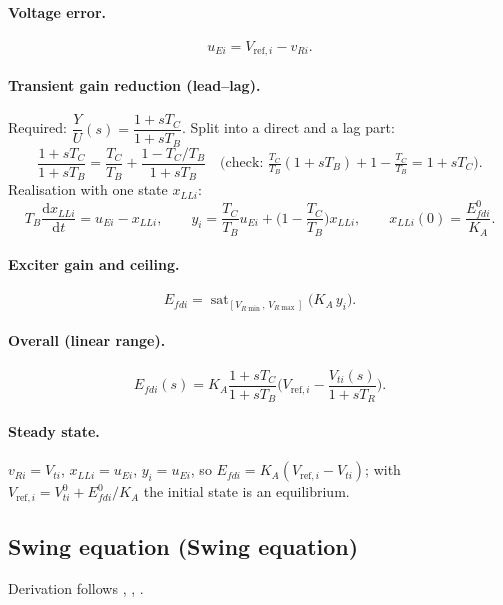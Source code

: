 \documentclass[11pt,a4paper]{article}
\numberwithin{equation}{section}
\newcommand{\sat}{\operatorname{sat}}
\newcommand{\dd}{\mathrm{d}}
\newcommand{\blk}[1]{\textsf{#1}}
\begin{document}
\paragraph{Voltage error.}
\begin{equation}
u_{Ei} = V_{\text{ref},i} - v_{Ri}.
\end{equation}
\paragraph{Transient gain reduction (lead--lag).} Required: $\dfrac{Y}{U}(s) = \dfrac{1+sT_C}{1+sT_B}$. Split into a direct and a lag part:
\begin{equation}
\frac{1+sT_C}{1+sT_B} = \frac{T_C}{T_B} + \frac{1-T_C/T_B}{1+sT_B}
\quad\Big(\text{check: } \tfrac{T_C}{T_B}(1+sT_B) + 1 - \tfrac{T_C}{T_B} = 1 + sT_C\Big).
\end{equation}
Realisation with one state $x_{LLi}$:
\begin{equation}
\boxed{T_B\frac{\dd x_{LLi}}{\dd t} = u_{Ei} - x_{LLi},\qquad
y_i = \frac{T_C}{T_B}u_{Ei} + \Big(1-\frac{T_C}{T_B}\Big)x_{LLi},\qquad x_{LLi}(0) = \frac{E_{fdi}^0}{K_A}.}
\end{equation}
\paragraph{Exciter gain and ceiling.}
\begin{equation}
\boxed{E_{fdi} = \sat_{[V_{R\min},\,V_{R\max}]}\big(K_A\,y_i\big).}
\end{equation}
\paragraph{Overall (linear range).}
\begin{equation}
E_{fdi}(s) = K_A\frac{1+sT_C}{1+sT_B}\Big(V_{\text{ref},i} - \frac{V_{ti}(s)}{1+sT_R}\Big).
\end{equation}
\paragraph{Steady state.} $v_{Ri}=V_{ti}$, $x_{LLi}=u_{Ei}$, $y_i=u_{Ei}$, so $E_{fdi} = K_A(V_{\text{ref},i}-V_{ti})$; with $V_{\text{ref},i} = V_{ti}^0 + E_{fdi}^0/K_A$ the initial state is an equilibrium.

\subsection{Swing equation (\blk{Swing equation})}
Derivation follows \cite[Ch.~3]{Kundur1994}, \cite[Ch.~3]{SauerPai1998}, \cite{KothariNagrath2011}.
\end{document}
